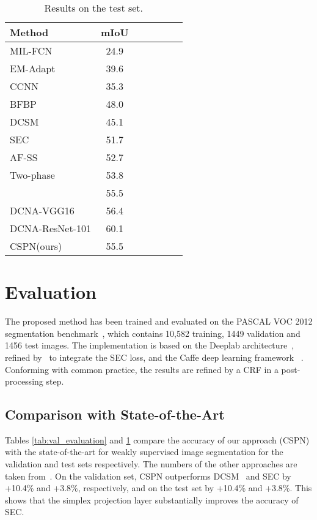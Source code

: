 \documentclass{bmvc2k}
\begin{document}
	\begin{table}[t]
		\begin{tabular}{l*{6}{c}}
			\hline
			Method              & mIoU  \\
		\hline
			MIL-FCN \citep{pathakICLR15} & 24.9 & \hspace{44.4mm} \\
			EM-Adapt \citep{papandreou2015weakly}  & 39.6 & \\
			CCNN \citep{pathak2015constrained}  & 35.3 & \\
			BFBP \citep{saleh2016built} & 48.0 & \\
			DCSM \citep{Shimoda2016DistinctCS} & 45.1 & \\
			SEC \citep{kolesnikov2016seed} &51.7 & \\
			AF-SS \citep{qi2016augmented} & 52.7 & \\
			Two-phase \citep{kim2017two} & 53.8 & \\
			\citet{roy2017combining} & 55.5 & \\
				DCNA-VGG16 \citet{zhang2018decoupled} &56.4&\\
				DCNA-ResNet-101 \citet{zhang2018decoupled} &60.1&\\
			CSPN(ours) &55.5&\\ 						
			\hline
		\end{tabular}
		  \caption{Results on the test set.} \label{tab:test_evaluation}
		\end{table}
     

	\section{Evaluation}
	The proposed method has been trained and evaluated on the PASCAL VOC 2012 segmentation benchmark~\citep{everingham2015pascal}, which contains 10,582  training, 1449 validation and 1456 test images. The implementation is based on the Deeplab architecture~\citep{chen2018deeplab}, refined by~\citet{kolesnikov2016seed} to integrate the SEC loss, and the Caffe deep learning framework ~\citep{jia2014caffe}. Conforming with common practice, the results are refined by a CRF in a post-processing step.
	
	\subsection{Comparison with State-of-the-Art}
	
	Tables \ref{tab:val_evaluation} and \ref{tab:test_evaluation} compare the accuracy of our approach (CSPN) with the state-of-the-art for weakly supervised image segmentation for the validation and test sets respectively. The numbers of the other approaches are taken from~\cite{zhang2018decoupled}. On the validation set, CSPN outperforms DCSM~\citep{Shimoda2016DistinctCS} and SEC \citep{kolesnikov2016seed} by +10.4\% and +3.8\%, respectively, and on the test set by +10.4\% and +3.8\%. This shows that the simplex projection layer substantially improves the accuracy of SEC. 
	
\end{document}
